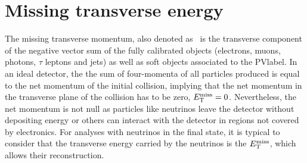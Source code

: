 \section{Missing transverse energy}

The missing transverse momentum, also denoted as \MET\ is the transverse component of the negative vector sum of the fully calibrated objects (electrons, muons, photons, $\tau$ leptons and jets) as well as soft objects associated to the \acrshort{PVlabel}. In an ideal detector, the the sum of four-momenta of all particles produced is equal to the net momentum of the initial collision, implying that the net momentum in the transverse plane of the collision has to be zero, $E_{\text{T}}^{\text{miss}}=0$. Nevertheless, the net momentum is not null as particles like neutrinos leave the detector without depositing energy or others can interact with the detector in regions not covered by electronics. For analyses with neutrinos in the final state, it is typical to consider that the transverse energy carried by the neutrinos is the $E_{\text{T}}^{\text{miss}}$, which allows their reconstruction.